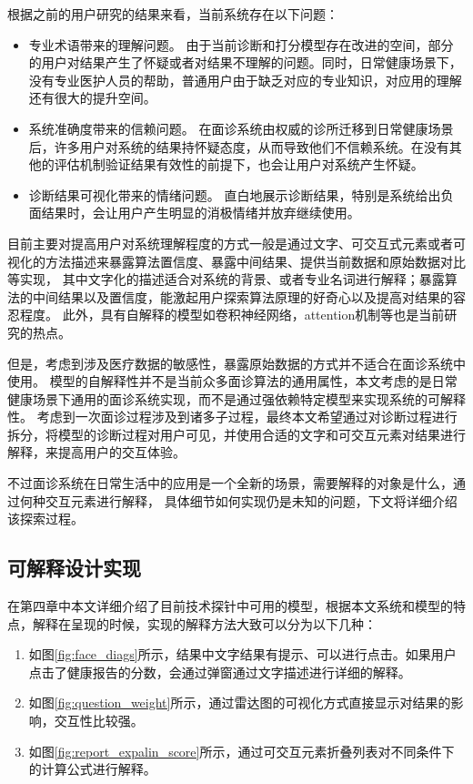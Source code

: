 根据之前的用户研究的结果来看，当前系统存在以下问题：
\begin{itemize}
    \item 专业术语带来的理解问题。
    由于当前诊断和打分模型存在改进的空间，部分的用户对结果产生了怀疑或者对结果不理解的问题。同时，日常健康场景下，没有专业医护人员的帮助，普通用户由于缺乏对应的专业知识，对应用的理解还有很大的提升空间。
    \item 系统准确度带来的信赖问题。
    在面诊系统由权威的诊所迁移到日常健康场景后，许多用户对系统的结果持怀疑态度，从而导致他们不信赖系统。在没有其他的评估机制验证结果有效性的前提下，也会让用户对系统产生怀疑。
    \item 诊断结果可视化带来的情绪问题。
    直白地展示诊断结果，特别是系统给出负面结果时，会让用户产生明显的消极情绪并放弃继续使用。
\end{itemize}


目前主要对提高用户对系统理解程度的方式一般是通过文字、可交互式元素或者可视化的方法描述来暴露算法置信度、暴露中间结果、提供当前数据和原始数据对比等实现\cite{wang2019designing, kocielnik2019will}，
其中文字化的描述适合对系统的背景、或者专业名词进行解释；暴露算法的中间结果以及置信度，能激起用户探索算法原理的好奇心以及提高对结果的容忍程度。
此外，具有自解释的模型如卷积神经网络，attention机制等也是当前研究的热点。

但是，考虑到涉及医疗数据的敏感性，暴露原始数据的方式并不适合在面诊系统中使用。
模型的自解释性并不是当前众多面诊算法的通用属性，本文考虑的是日常健康场景下通用的面诊系统实现，而不是通过强依赖特定模型来实现系统的可解释性。
考虑到一次面诊过程涉及到诸多子过程，最终本文希望通过对诊断过程进行拆分，将模型的诊断过程对用户可见，并使用合适的文字和可交互元素对结果进行解释，来提高用户的交互体验。


不过面诊系统在日常生活中的应用是一个全新的场景，需要解释的对象是什么，通过何种交互元素进行解释，
具体细节如何实现仍是未知的问题，下文将详细介绍该探索过程。


\subsection{可解释设计实现}

在第四章中本文详细介绍了目前技术探针中可用的模型，根据本文系统和模型的特点，解释在呈现的时候，实现的解释方法大致可以分为以下几种：
\begin{enumerate}
    \item 如图\ref{fig:face_diags}所示，结果中文字结果有提示、可以进行点击。如果用户点击了健康报告的分数，会通过弹窗通过文字描述进行详细的解释。

    \item 如图\ref{fig:question_weight}所示，通过雷达图的可视化方式直接显示对结果的影响，交互性比较强。 
    
    \item 如图\ref{fig:report_expalin_score}所示，通过可交互元素折叠列表对不同条件下的计算公式进行解释。
\end{enumerate}


